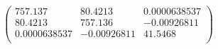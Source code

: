 \documentclass{article}
\begin{document}
\[\left(
\begin{array}{ccc}
 757.137 & 80.4213 & 0.0000638537 \\
 80.4213 & 757.136 & -0.00926811 \\
 0.0000638537 & -0.00926811 & 41.5468 \\
\end{array}
\right)\]
\end{document}

